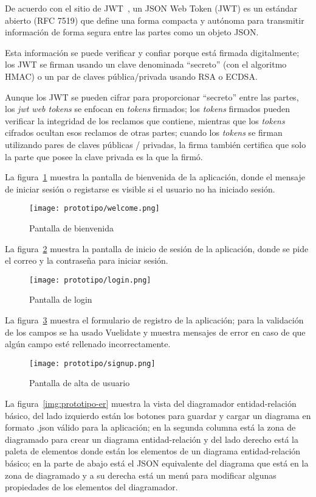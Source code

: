 De acuerdo con el sitio de JWT~\cite{jwt_web_2020}, un JSON Web Token (JWT) es un estándar abierto (RFC 7519) que define una forma compacta y autónoma para transmitir información de forma segura entre las partes como un objeto JSON.


Esta información se puede verificar y confiar porque está firmada digitalmente; los JWT se firman usando un clave denominada ``secreto'' (con el algoritmo HMAC) o un par de claves pública/privada usando RSA o ECDSA.

Aunque los JWT se pueden cifrar para proporcionar ``secreto'' entre las partes, los \textit{jwt web tokens} se enfocan en \textit{tokens} firmados; los \textit{tokens} firmados pueden verificar la integridad de los reclamos que contiene, mientras que los \textit{tokens} cifrados ocultan esos reclamos de otras partes; cuando los \textit{tokens} se firman utilizando pares de claves públicas / privadas, la firma también certifica que solo la parte que posee la clave privada es la que la firmó.


La figura~\ref{img:prototipo-welcome} muestra la pantalla de bienvenida de la aplicación, donde el mensaje de iniciar sesión o registarse es visible si el usuario no ha iniciado sesión.

\begin{figure}[H]
    \centering
    \texttt{[image: prototipo/welcome.png]}
    \caption{Pantalla de bienvenida}
    \label{img:prototipo-welcome}
\end{figure}

La figura~\ref{img:prototipo-login} muestra la pantalla de inicio de sesión de la aplicación, donde se pide el correo y la contraseña para iniciar sesión.


\begin{figure}[H]
    \centering
    \texttt{[image: prototipo/login.png]}
    \caption{Pantalla de login}
    \label{img:prototipo-login}
\end{figure}
La figura~\ref{img:prototipo-signup} muestra el formulario de registro de la aplicación; para la validación de los campos se ha usado Vuelidate y muestra mensajes de error en caso de que algún campo esté rellenado incorrectamente.


\begin{figure}[H]
    \centering
    \texttt{[image: prototipo/signup.png]}
    \caption{Pantalla de alta de usuario}
    \label{img:prototipo-signup}
\end{figure}
La figura~\ref{img:prototipo-er} muestra la vista del diagramador entidad-relación básico, del lado izquierdo están los botones para guardar y cargar un diagrama en formato .json válido para la aplicación; en la segunda columna está la zona de diagramado para crear un diagrama entidad-relación y del lado derecho está la paleta de elementos donde están los elementos de un diagrama entidad-relación básico; en la parte de abajo está el JSON equivalente del diagrama que está en la zona de diagramado y a su derecha está un menú para modificar algunas propiedades de los elementos del diagramador.

